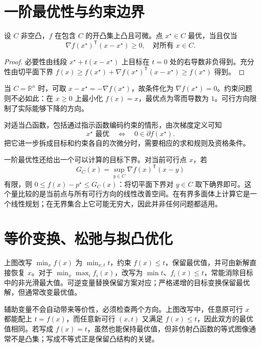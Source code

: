 \documentclass[UTF8,12pt,a4paper,fontset=fandol]{ctexbook}
\begin{document}
\section{一阶最优性与约束边界}

\begin{theorem}
设 $C$ 非空凸，$f$ 在包含 $C$ 的开凸集上凸且可微。点 $x^\star\in C$ 最优，当且仅当
\begin{equation}
 \nabla f(x^\star)^{\mathsf T}(x-x^\star)\geq0,
 \quad\text{对所有 }x\in C.
 \label{eq:co-first-order-optimality}
\end{equation}
\end{theorem}
\begin{proof}
必要性由线段 $x^\star+t(x-x^\star)$ 上目标在 $t=0$ 处的右导数非负得到。充分性由切平面下界 $f(x)\geq f(x^\star)+\nabla f(x^\star)^{\mathsf T}(x-x^\star)\geq f(x^\star)$ 得到。
\end{proof}

当 $C=\mathbb R^n$ 时，可取 $x-x^\star=-\nabla f(x^\star)$，故条件化为 $\nabla f(x^\star)=0$。约束问题则不必如此：在 $x\geq0$ 上最小化 $f(x)=x$，最优点为零而导数为 $1$。可行方向限制了实际能够下降的方向。

对适当凸函数，包括通过指示函数编码约束的情形，由次梯度定义可知
\[
 x^\star\text{ 最优}\quad\Longleftrightarrow\quad0\in\partial f(x^\star).
\]
把它进一步拆成目标和约束各自的次微分时，需要相应的求和规则及资格条件。

一阶最优性还给出一个可以计算的目标下界。对当前可行点 $x$，若
\[
 G_C(x)=\sup_{y\in C}\nabla f(x)^{\mathsf T}(x-y)
\]
有限，则 $0\leq f(x)-p^\star\leq G_C(x)$：将切平面下界对 $y\in C$ 取下确界即可。这个量比较的是当前点与所有可行方向的线性改善空间。在有界多面体上计算它是一个线性规划；在无界集合上它可能无穷大，因此并非任何问题都适用。

\section{等价变换、松弛与拟凸优化}

上图改写 $\min_x f(x)$ 为 $\min_{x,t}t$，约束 $f(x)\leq t$，保留最优值，并可由新解直接恢复 $x$。对于 $\min_x\max_i f_i(x)$，改写为 $\min t$、$f_i(x)\leq t$，常能消除目标中的非光滑最大值。可逆变量替换保留方案对应；严格递增的目标变换保留最优解，但通常改变最优值。

辅助变量不会自动带来等价性，必须检查两个方向。上图改写中，任意原可行 $x$ 都能配上 $t=f(x)$，而任意新可行 $(x,t)$ 又满足 $f(x)\leq t$，因此双方的最优值相同。若写成 $f(x)=t$，虽然也能保持最优值，但非仿射凸函数的等式图像通常不是凸集；写成不等式正是保留凸结构的关键。
\end{document}
